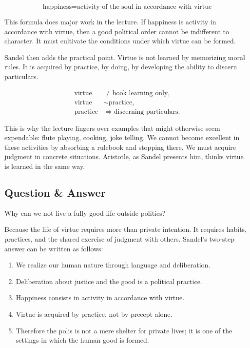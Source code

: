\begin{equation}
\text{happiness}
=
\text{activity of the soul in accordance with virtue}
\end{equation}

This formula does major work in the lecture. If happiness is activity in accordance with virtue, then a good political order cannot be indifferent to character. It must cultivate the conditions under which virtue can be formed.

Sandel then adds the practical point. Virtue is not learned by memorizing moral rules. It is acquired by practice, by doing, by developing the ability to discern particulars.

\begin{align}
\text{virtue} &\neq \text{book learning only},\\
\text{virtue} &\sim \text{practice},\\
\text{practice} &\Longrightarrow \text{discerning particulars}.
\end{align}

This is why the lecture lingers over examples that might otherwise seem expendable: flute playing, cooking, joke telling. We cannot become excellent in these activities by absorbing a rulebook and stopping there. We must acquire judgment in concrete situations. Aristotle, as Sandel presents him, thinks virtue is learned in the same way.

\subsection{Question \& Answer}

Why can we not live a fully good life outside politics?

Because the life of virtue requires more than private intention. It requires habits, practices, and the shared exercise of judgment with others. Sandel's two-step answer can be written as follows:

\begin{enumerate}
\item We realize our human nature through language and deliberation.
\item Deliberation about justice and the good is a political practice.
\item Happiness consists in activity in accordance with virtue.
\item Virtue is acquired by practice, not by precept alone.
\item Therefore the polis is not a mere shelter for private lives; it is one of the settings in which the human good is formed.
\end{enumerate}

